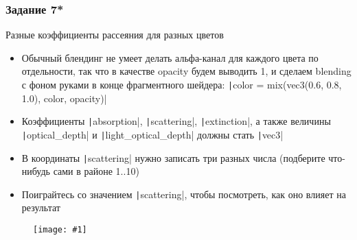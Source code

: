 \documentclass[10pt]{beamer}
\newcommand{\slideimage}[1]{
  \begin{figure}
    \begin{adjustbox}{width=\textwidth, totalheight=\textheight-2\baselineskip-2\baselineskip,keepaspectratio}
      \texttt{[image: \#1]}
    \end{adjustbox}
  \end{figure}
}
\begin{document}
\begin{frame}[fragile]
\frametitle{Задание 7*}
Разные коэффициенты рассеяния для разных цветов
\begin{itemize}
\item Обычный блендинг не умеет делать альфа-канал для каждого цвета по отдельности, так что в качестве opacity будем выводить 1, и сделаем blending с фоном руками в конце фрагментного шейдера: \texttt|color = mix(vec3(0.6, 0.8, 1.0), color, opacity)|
\item Коэффициенты \texttt|absorption|, \texttt|scattering|, \texttt|extinction|, а также величины \texttt|optical_depth| и \texttt|light_optical_depth| должны стать \texttt|vec3|
\item В координаты \texttt|scattering| нужно записать три разных числа (подберите что-нибудь сами в районе 1..10)
\item Поиграйтесь со значением \texttt|scattering|, чтобы посмотреть, как оно влияет на результат
\end{itemize}
\end{frame}

\begin{frame}[fragile]
\slideimage{7.png}
\end{frame}
\end{document}
